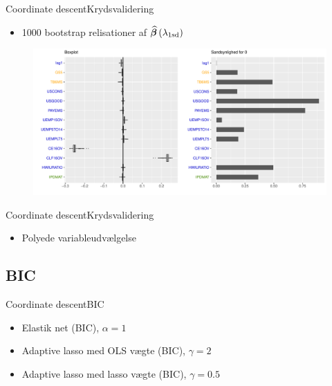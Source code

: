 \begin{frame}{Coordinate descent}{Krydsvalidering}
\begin{itemize}
\item 1000 bootstrap relisationer af $\widehat{\vbeta} \del{\lambda_{1\text{sd}}}$
\end{itemize}
\begin{figure}[!htb]
        \includegraphics[width=1\linewidth, height=0.7\textheight]{slides/boxplot_lasso_kryds.pdf}
\end{figure}
\end{frame}

\begin{frame}{Coordinate descent}{Krydsvalidering}
\begin{itemize}
\item Polyede variableudvælgelse 
\end{itemize}

\end{frame}

\subsection{BIC}
\begin{frame}{Coordinate descent}{BIC}
\begin{itemize}
\item Elastik net (BIC), $\alpha = 1$
\item Adaptive lasso med OLS vægte (BIC), $\gamma = 2$
\item Adaptive lasso med lasso vægte (BIC), $\gamma = 0.5$
\end{itemize}
\end{frame}

